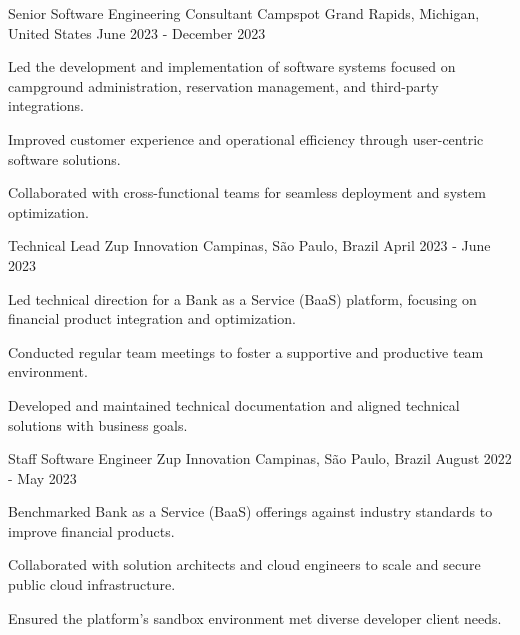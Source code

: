 \begin{cventries}
\cventry
    {Senior Software Engineering Consultant} %
    {Campspot} %
    {Grand Rapids, Michigan, United States} %
    {June 2023 - December 2023} %
    {
      \begin{cvitems} %
        \item {Led the development and implementation of software systems focused on campground administration, reservation management, and third-party integrations.}
        \item {Improved customer experience and operational efficiency through user-centric software solutions.}
        \item {Collaborated with cross-functional teams for seamless deployment and system optimization.}
      \end{cvitems}
    }

\cventry
    {Technical Lead} %
    {Zup Innovation} %
    {Campinas, São Paulo, Brazil} %
    {April 2023 - June 2023} %
    {
      \begin{cvitems} %
        \item {Led technical direction for a Bank as a Service (BaaS) platform, focusing on financial product integration and optimization.}
        \item {Conducted regular team meetings to foster a supportive and productive team environment.}
        \item {Developed and maintained technical documentation and aligned technical solutions with business goals.}
      \end{cvitems}
    }

\cventry
    {Staff Software Engineer} %
    {Zup Innovation} %
    {Campinas, São Paulo, Brazil} %
    {August 2022 - May 2023} %
    {
      \begin{cvitems} %
        \item {Benchmarked Bank as a Service (BaaS) offerings against industry standards to improve financial products.}
        \item {Collaborated with solution architects and cloud engineers to scale and secure public cloud infrastructure.}
        \item {Ensured the platform's sandbox environment met diverse developer client needs.}
      \end{cvitems}
    }


\end{cventries}
